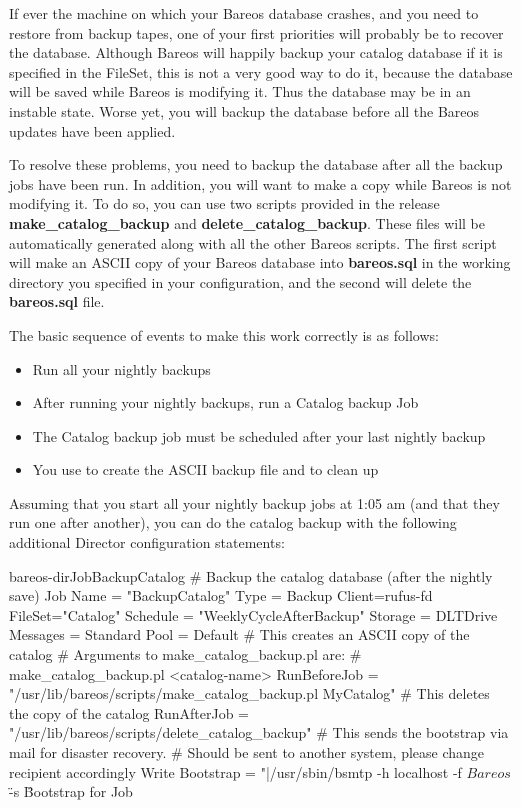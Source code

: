 If ever the machine on which your Bareos database crashes, and you need to
restore from backup tapes, one of your first priorities will probably be to
recover the database. Although Bareos will happily backup your catalog
database if it is specified in the FileSet, this is not a very good way to do
it, because the database will be saved while Bareos is modifying it. Thus the
database may be in an instable state. Worse yet, you will backup the database
before all the Bareos updates have been applied.

To resolve these problems, you need to backup the database after all the backup
jobs have been run. In addition, you will want to make a copy while Bareos is
not modifying it. To do so, you can use two scripts provided in the release
{\bf make\_catalog\_backup} and {\bf delete\_catalog\_backup}. These files
will be automatically generated along with all the other Bareos scripts. The
first script will make an ASCII copy of your Bareos database into {\bf
bareos.sql} in the working directory you specified in your configuration, and
the second will delete the {\bf bareos.sql} file.

The basic sequence of events to make this work correctly is as follows:

\begin{itemize}
\item Run all your nightly backups
\item After running your nightly backups, run a Catalog backup Job
\item The Catalog backup job must be scheduled after your last nightly backup

\item You use  to create the ASCII  backup file
      and  to clean up
\end{itemize}

Assuming that you start all your nightly backup jobs at 1:05 am (and that they
run one after another), you can do the catalog backup with the following
additional Director configuration statements:

\begin{bareosConfigResource}{bareos-dir}{Job}{BackupCatalog}
# Backup the catalog database (after the nightly save)
Job {
  Name = "BackupCatalog"
  Type = Backup
  Client=rufus-fd
  FileSet="Catalog"
  Schedule = "WeeklyCycleAfterBackup"
  Storage = DLTDrive
  Messages = Standard
  Pool = Default
  # This creates an ASCII copy of the catalog
  # Arguments to make_catalog_backup.pl are:
  #  make_catalog_backup.pl <catalog-name>
  RunBeforeJob = "/usr/lib/bareos/scripts/make_catalog_backup.pl MyCatalog"
  # This deletes the copy of the catalog
  RunAfterJob  = "/usr/lib/bareos/scripts/delete_catalog_backup"
  # This sends the bootstrap via mail for disaster recovery.
  # Should be sent to another system, please change recipient accordingly
  Write Bootstrap = "|/usr/sbin/bsmtp -h localhost -f \"\(Bareos\) \" -s \"Bootstrap for Job %
}
\end{bareosConfigResource}

